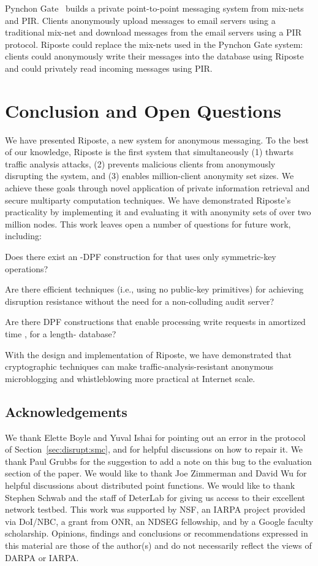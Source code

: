 \documentclass[10pt,twocolumn]{article}
\newcommand{\name}{Riposte\xspace}
\newcommand{\Name}{Riposte\xspace}
\begin{document}
Pynchon Gate~\cite{sassaman2005pynchon} builds a 
private point-to-point messaging system from mix-nets and PIR.
Clients anonymously upload messages to email servers using a traditional mix-net
and download messages from the email servers using a PIR protocol.
\Name could replace the mix-nets used in the Pynchon Gate system: clients
could anonymously write their messages into the database using \name
and could privately read incoming messages using PIR.

 \section{Conclusion and Open Questions}
\label{sec:concl}

We have presented \name, a new system for anonymous messaging.
To the best of our knowledge, \name is the first system
that simultaneously 
(1) thwarts traffic analysis attacks,
(2) prevents malicious clients from anonymously disrupting the system, and
(3) enables million-client anonymity set sizes.
We achieve these goals through novel application of private information
retrieval and secure multiparty computation techniques.
We have demonstrated \name's practicality by implementing it and
evaluating it with anonymity sets of over two million nodes.
This work leaves open a number of questions for future work, including:
\begin{compactitem}
\item Does there exist an -DPF construction for 
      that uses only symmetric-key operations?
\item Are there efficient techniques 
      (i.e., using no public-key primitives) for achieving
      disruption resistance without the need for a
      non-colluding audit server?
\item Are there DPF constructions that enable processing
      write requests in amortized time , for a 
      length- database?
\end{compactitem}
With the design and implementation of \name,
we have demonstrated that cryptographic techniques can 
make traffic-analysis-resistant anonymous microblogging
and whistleblowing more practical at Internet scale.


\subsection*{Acknowledgements}
We thank Elette Boyle and Yuval Ishai for pointing out an error in 
the  protocol of Section~\ref{sec:disrupt:smc},
and for helpful discussions on how to repair it.
We thank Paul Grubbs for the suggestion to add a note on this bug
to the evaluation section of the paper.
We would like to thank Joe Zimmerman and David
Wu for helpful discussions about distributed point functions.
We would like to thank Stephen Schwab and the staff of
DeterLab for giving us access to their excellent network testbed. 
This work was supported by NSF, an IARPA project provided via DoI/NBC,
a grant from ONR, an NDSEG fellowship, 
and by a Google faculty scholarship. Opinions,
findings and conclusions or recommendations expressed in this material
are those of the author(s) and do not necessarily reflect the views of
DARPA or IARPA.
\end{document}
